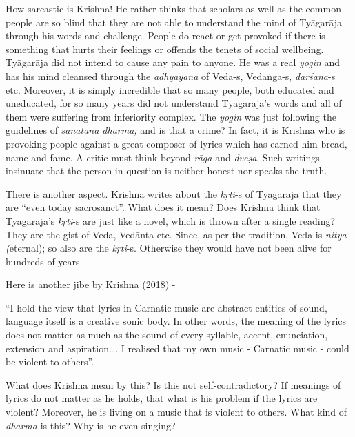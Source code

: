 How sarcastic is Krishna! He rather thinks that scholars as well as the common people are so blind that they are not able to understand the mind of Tyāgarāja through his words and challenge. People do react or get provoked if there is something that hurts their feelings or offends the tenets of social wellbeing. Tyāgarāja did not intend to cause any pain to anyone. He was a real \textit{yogin} and has his mind cleansed through the \textit{adhyayana} of Veda-s, Vedāṅga-s, \textit{darśana}-s etc. Moreover, it is simply incredible that so many people, both educated and uneducated, for so many years did not understand Tyāgaraja’s words and all of them were suffering from inferiority complex. The \textit{yogin} was just following the guidelines of \textit{sanātana dharma;} and is that a crime? In fact, it is Krishna who is provoking people against a great composer of lyrics which has earned him bread, name and fame. A critic must think beyond \textit{rāga} and \textit{dveṣa}. Such writings insinuate that the person in question is neither honest nor speaks the truth. 

There is another aspect. Krishna writes about the \textit{kṛti}-s of Tyāgarāja that they are “even today sacrosanct”. What does it mean? Does Krishna think that Tyāgarāja’s \textit{kṛti}-s are just like a novel, which is thrown after a single reading? They are the gist of Veda, Vedānta etc. Since, as per the tradition, Veda is \textit{nitya (}eternal); so also are the \textit{kṛti}-s. Otherwise they would have not been alive for hundreds of years. 

Here is another jibe by Krishna (2018) -

\begin{myquote}
“I hold the view that lyrics in Carnatic music are abstract entities of sound, language itself is a creative sonic body. In other words, the meaning of the lyrics does not matter as much as the sound of every syllable, accent, enunciation, extension and aspiration…. I realised that my own music - Carnatic music - could be violent to others”.
\end{myquote}

What does Krishna mean by this? Is this not self-contradictory? If meanings of lyrics do not matter as he holds, that what is his problem if the lyrics are violent? Moreover, he is living on a music that is violent to others. What kind of \textit{dharma} is this? Why is he even singing?

